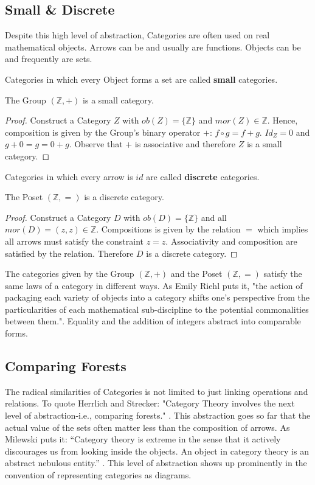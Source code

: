 \documentclass{article}
\begin{document}
\subsection{Small \& Discrete}
Despite this high level of abstraction, Categories are often used on real mathematical objects. Arrows can be and usually are functions. Objects can be and frequently are sets.
\begin{definition}
Categories in which every Object forms a set are called \textbf{small} categories.
\end{definition}
\begin{theorem}
The Group $(\mathbb{Z}, +)$ is a small category.
\end{theorem}
\begin{proof}
Construct a Category $Z$ with $ob(Z) = \{\mathbb{Z}\}$ and $mor(Z) \in \mathbb{Z}$. Hence, composition is given by the Group's binary operator $+$: $f \circ g = f + g$. $Id_Z = 0$ and $g + 0 = g = 0 + g$. Observe that $+$ is associative and therefore $Z$ is a small category.
\end{proof}
\begin{definition}
 Categories in which every arrow is $id$ are called \textbf{discrete} categories.
\end{definition}
\begin{theorem}
The Poset $(\mathbb{Z}, =)$ is a discrete category.
\end{theorem}
\begin{proof}
Construct a Category $D$ with $ob(D) = \{\mathbb{Z}\}$ and all $mor(D) = (z,z) \in \mathbb{Z}$. Compositions is given by the relation $=$ which implies all arrows must satisfy the constraint $z = z$. Associativity and composition are satisfied by the relation. Therefore $D$ is a discrete category.
\end{proof}
The categories given by the Group $(\mathbb{Z}, +)$ and the Poset $(\mathbb{Z}, =)$ satisfy the same laws of a category in different ways. As Emily Riehl puts it, "the action of packaging each variety of objects into a category shifts one's perspective from the particularities of each mathematical sub-discipline to the potential commonalities between them."\cite{Riehl01}. Equality and the addition of integers abstract into comparable forms.
\subsection{Comparing Forests}
The radical similarities of Categories is not limited to just linking operations and relations. To quote Herrlich and Strecker: "Category Theory involves the next level of abstraction-i.e., comparing forests." \cite{Herrlich01}. This abstraction goes so far that the actual value of the sets often matter less than the composition of arrows. As Milewski puts it: “Category theory is extreme in the sense that it actively discourages us from looking inside the objects. An object in category theory is an abstract nebulous entity.” \cite{Milewski01}. This level of abstraction shows up prominently in the convention of representing categories as diagrams.
\end{document}

